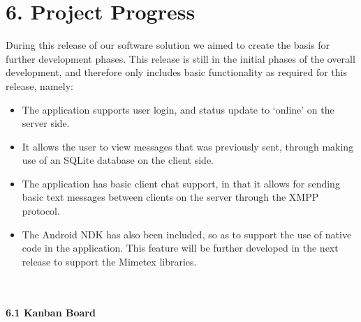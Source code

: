\documentclass[29pt,a4paper]{moderncv}
\begin{document}
\newpage
		\section*{6. Project Progress}
		During this release of our software solution we aimed to create the basis for further development phases.  This release is still in the initial phases of the overall development, and therefore only includes basic functionality as required for this release, namely:
		
		\begin{itemize}
			\item The application supports user login, and status update to ‘online’ on the server side.
			\item It allows the user to view messages that was previously sent, through making use of an SQLite database on the client side.
			\item The application has basic client chat support, in that it allows for sending basic text messages between clients on the server through the XMPP protocol.
			\item The Android NDK has also been included, so as to support the use of native code in the application.  This feature will be further developed in the next release to support the Mimetex libraries.	\\
		\end{itemize} \\
\newpage		
		\\ \noindent\textbf{6.1 Kanban Board} \\
\end{document}
